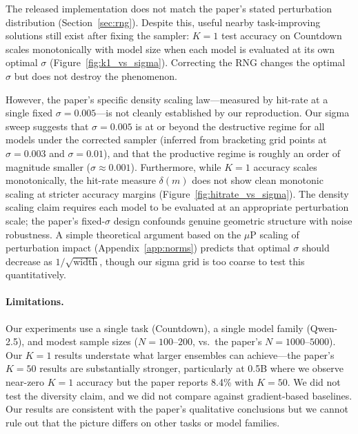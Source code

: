 \documentclass[11pt]{article}
\begin{document}
The released implementation does not match the paper's stated perturbation distribution (Section~\ref{sec:rng}). Despite this, useful nearby task-improving solutions still exist after fixing the sampler: $K=1$ test accuracy on Countdown scales monotonically with model size when each model is evaluated at its own optimal $\sigma$ (Figure~\ref{fig:k1_vs_sigma}). Correcting the RNG changes the optimal $\sigma$ but does not destroy the phenomenon.

However, the paper's specific density scaling law---measured by hit-rate at a single fixed $\sigma=0.005$---is not cleanly established by our reproduction. Our sigma sweep suggests that $\sigma=0.005$ is at or beyond the destructive regime for all models under the corrected sampler (inferred from bracketing grid points at $\sigma=0.003$ and $\sigma=0.01$), and that the productive regime is roughly an order of magnitude smaller ($\sigma\approx 0.001$). Furthermore, while $K=1$ accuracy scales monotonically, the hit-rate measure $\delta(m)$ does not show clean monotonic scaling at stricter accuracy margins (Figure~\ref{fig:hitrate_vs_sigma}). The density scaling claim requires each model to be evaluated at an appropriate perturbation scale; the paper's fixed-$\sigma$ design confounds genuine geometric structure with noise robustness. A simple theoretical argument based on the $\mu$P scaling of perturbation impact (Appendix~\ref{app:norms}) predicts that optimal $\sigma$ should decrease as $1/\sqrt{\text{width}}$, though our sigma grid is too coarse to test this quantitatively.

\paragraph{Limitations.} Our experiments use a single task (Countdown), a single model family (Qwen-2.5), and modest sample sizes ($N=100$--$200$, vs.\ the paper's $N=1000$--$5000$). Our $K=1$ results understate what larger ensembles can achieve---the paper's $K=50$ results are substantially stronger, particularly at 0.5B where we observe near-zero $K=1$ accuracy but the paper reports 8.4\% with $K=50$. We did not test the diversity claim, and we did not compare against gradient-based baselines. Our results are consistent with the paper's qualitative conclusions but we cannot rule out that the picture differs on other tasks or model families.






\appendix
\end{document}
